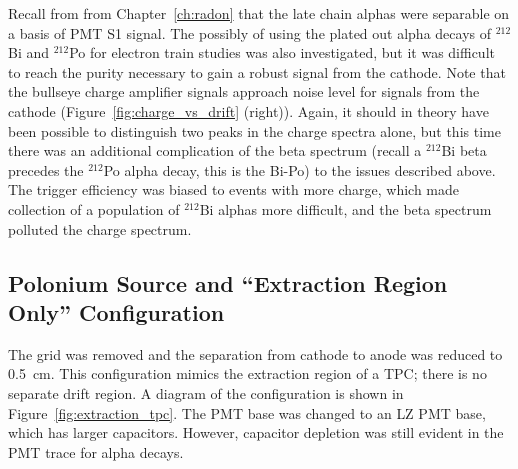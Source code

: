 Recall from from Chapter~\ref{ch:radon} that the late chain alphas were separable on a basis of \ac{PMT} S1 signal. The possibly of using the plated out alpha decays of $^{212}$Bi and $^{212}$Po for electron train studies was also investigated, but it was difficult to reach the purity necessary to gain a robust signal from the cathode. Note that the bullseye charge amplifier signals approach noise level for signals from the cathode (Figure~\ref{fig:charge_vs_drift} (right)). Again, it should in theory have been possible to distinguish two peaks in the charge spectra alone, but this time there was an additional complication of the beta spectrum (recall a $^{212}$Bi beta precedes the $^{212}$Po alpha decay, this is the Bi-Po) to the issues described above. The trigger efficiency was biased to events with more charge, which made collection of a population of $^{212}$Bi alphas more difficult, and the beta spectrum polluted the charge spectrum. 


\subsection{Polonium Source and ``Extraction Region Only'' Configuration}
The grid was removed and the separation from cathode to anode was reduced to 0.5~cm. This configuration mimics the extraction region of a \ac{TPC}; there is no separate drift region. A diagram of the configuration is shown in Figure~\ref{fig:extraction_tpc}. The \ac{PMT} base was changed to an \ac{LZ} \ac{PMT} base, which has larger capacitors. However, capacitor depletion was still evident in the \ac{PMT} trace for alpha decays.  

